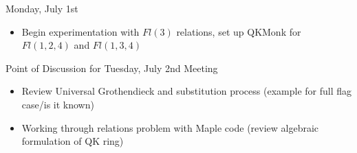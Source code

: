 Monday, July 1st
\begin{itemize}
    \item Begin experimentation with $Fl(3)$ relations, set up QKMonk for $Fl(1, 2, 4)$ and $Fl(1, 3, 4)$
\end{itemize}

Point of Discussion for Tuesday, July 2nd Meeting
\begin{itemize}
    \item Review Universal Grothendieck and substitution process (example for full flag case/is it known)
    \item Working through relations problem with Maple code (review algebraic formulation of QK ring)
\end{itemize}